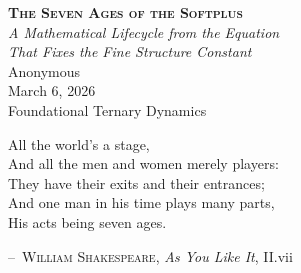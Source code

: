 \documentclass[12pt, letterpaper]{article}
\theoremstyle{plain}
\theoremstyle{definition}
\theoremstyle{remark}
\begin{document}
\begin{center}
\vspace*{0.4cm}
{\LARGE\bfseries\scshape The Seven Ages of the Softplus}\\[0.5em]
{\large\itshape A Mathematical Lifecycle from the Equation\\
That Fixes the Fine Structure Constant}\\[1.8em]
{\large Anonymous}\\[1.6em]
{\normalsize March 6, 2026}\\[0.3em]
{\small Foundational Ternary Dynamics}
\end{center}

\vspace{0.6em}

\epigraph{All the world's a stage,\\
And all the men and women merely players:\\
They have their exits and their entrances;\\
And one man in his time plays many parts,\\
His acts being seven ages.}%
{\textsc{--~William Shakespeare}, \textit{As You Like It}, II.vii}

\vspace{0.5em}
\end{document}
